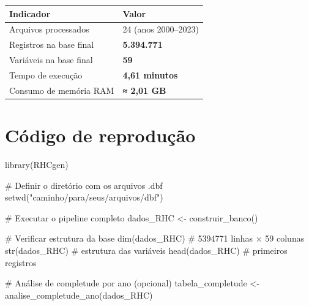 \documentclass[
  brazilian,
  a4paper,
  oneside]{scrbook}
\newenvironment{Shaded}{\begin{snugshade}}{\end{snugshade}}
\newcommand{\CommentTok}[1]{\textcolor[rgb]{0.37,0.37,0.37}{#1}}
\newcommand{\FunctionTok}[1]{\textcolor[rgb]{0.28,0.35,0.67}{#1}}
\newcommand{\NormalTok}[1]{\textcolor[rgb]{0.00,0.23,0.31}{#1}}
\newcommand{\OtherTok}[1]{\textcolor[rgb]{0.00,0.23,0.31}{#1}}
\newcommand{\StringTok}[1]{\textcolor[rgb]{0.13,0.47,0.30}{#1}}
\newcounter{none} %
\begin{document}
{\def\LTcaptype{none} %
\begin{longtable}[]{@{}ll@{}}
\toprule\noalign{}
Indicador & Valor \\
\midrule\noalign{}
\endhead
\bottomrule\noalign{}
\endlastfoot
Arquivos processados & 24 (anos 2000--2023) \\
Registros na base final & \textbf{5.394.771} \\
Variáveis na base final & \textbf{59} \\
Tempo de execução & \textbf{4,61 minutos} \\
Consumo de memória RAM & \textbf{≈ 2,01 GB} \\
\end{longtable}
}

\section{Código de reprodução}\label{cuxf3digo-de-reproduuxe7uxe3o}

\begin{Shaded}
\begin{Highlighting}[]
\FunctionTok{library}\NormalTok{(RHCgen)}

\CommentTok{\# Definir o diretório com os arquivos .dbf}
\FunctionTok{setwd}\NormalTok{(}\StringTok{"caminho/para/seus/arquivos/dbf"}\NormalTok{)}

\CommentTok{\# Executar o pipeline completo}
\NormalTok{dados\_RHC }\OtherTok{\textless{}{-}} \FunctionTok{construir\_banco}\NormalTok{()}

\CommentTok{\# Verificar estrutura da base}
\FunctionTok{dim}\NormalTok{(dados\_RHC)       }\CommentTok{\# 5394771 linhas × 59 colunas}
\FunctionTok{str}\NormalTok{(dados\_RHC)       }\CommentTok{\# estrutura das variáveis}
\FunctionTok{head}\NormalTok{(dados\_RHC)      }\CommentTok{\# primeiros registros}

\CommentTok{\# Análise de completude por ano (opcional)}
\NormalTok{tabela\_completude }\OtherTok{\textless{}{-}} \FunctionTok{analise\_completude\_ano}\NormalTok{(dados\_RHC)}
\end{Highlighting}
\end{Shaded}
\end{document}
